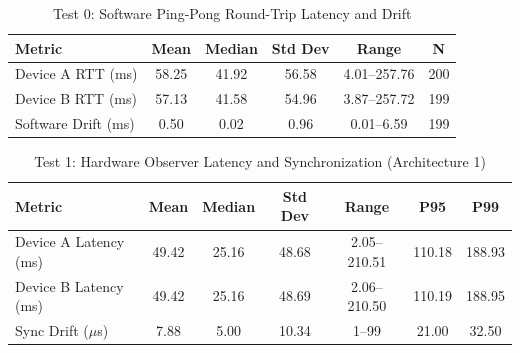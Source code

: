 

\begin{table}[htbp]
\centering
\caption{Test 0: Software Ping-Pong Round-Trip Latency and Drift}
\begin{tabular}{|l|c|c|c|c|c|}
\hline
\textbf{Metric} & \textbf{Mean} & \textbf{Median} & \textbf{Std Dev} & \textbf{Range} & \textbf{N} \\ \hline
Device A RTT (ms) & 58.25 & 41.92 & 56.58 & 4.01--257.76 & 200 \\ \hline
Device B RTT (ms) & 57.13 & 41.58 & 54.96 & 3.87--257.72 & 199 \\ \hline
Software Drift (ms) & 0.50 & 0.02 & 0.96 & 0.01--6.59 & 199 \\ \hline
\end{tabular}
\label{tab:test0_results}
\end{table}


\begin{table}[htbp]
\centering
\caption{Test 1: Hardware Observer Latency and Synchronization (Architecture 1)}
\begin{tabular}{|l|c|c|c|c|c|c|}
\hline
\textbf{Metric} & \textbf{Mean} & \textbf{Median} & \textbf{Std Dev} & \textbf{Range} & \textbf{P95} & \textbf{P99} \\ \hline
Device A Latency (ms) & 49.42 & 25.16 & 48.68 & 2.05--210.51 & 110.18 & 188.93 \\ \hline
Device B Latency (ms) & 49.42 & 25.16 & 48.69 & 2.06--210.50 & 110.19 & 188.95 \\ \hline
Sync Drift ($\mu$s) & 7.88 & 5.00 & 10.34 & 1--99 & 21.00 & 32.50 \\ \hline
\end{tabular}
\label{tab:test1_results}
\end{table}

